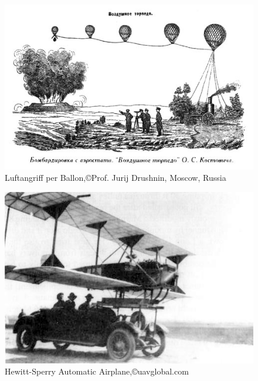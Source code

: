 

\begin{figure}[p]
\begin{center}
\includegraphics[scale=0.5]{img/balloonbombs.jpg}
\caption{Luftangriff per Ballon,©Prof. Jurij Drushnin, Moscow, Russia}
\label{ballonbombs}
\end{center}
\end{figure}

\begin{figure}[p]
\begin{center}
\includegraphics[scale=0.5]{img/flying_bomb.jpg}
\caption{Hewitt-Sperry Automatic Airplane,©uavglobal.com}
\label{Flying Bomb}
\end{center}
\end{figure}

